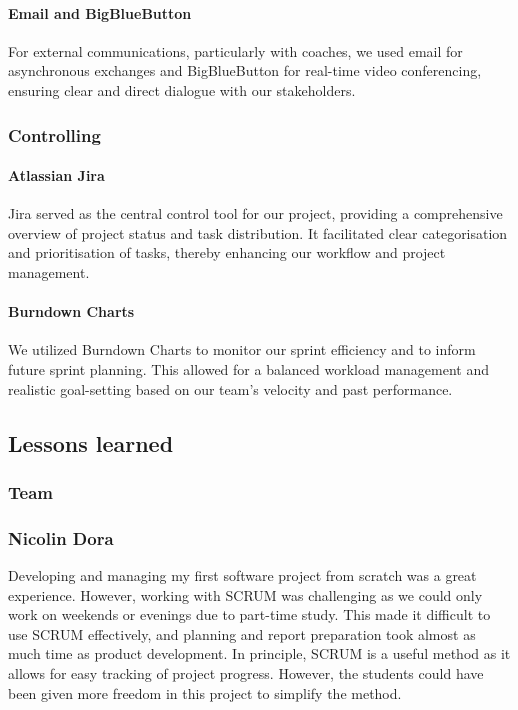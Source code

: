 \paragraph{Email and BigBlueButton}
For external communications, particularly with coaches, we used email for asynchronous exchanges and BigBlueButton for real-time video conferencing, ensuring clear and direct dialogue with our stakeholders.

\subsubsection{Controlling}

\paragraph{Atlassian Jira}
Jira served as the central control tool for our project, providing a comprehensive overview of project status and task distribution.
It facilitated clear categorisation and prioritisation of tasks, thereby enhancing our workflow and project management.

\paragraph{Burndown Charts}
We utilized Burndown Charts to monitor our sprint efficiency and to inform future sprint planning.
This allowed for a balanced workload management and realistic goal-setting based on our team's velocity and past performance.


\subsection{Lessons learned}

\subsubsection{Team}

\subsubsection{Nicolin Dora}
Developing and managing my first software project from scratch was a great experience.
However, working with SCRUM was challenging as we could only work on weekends or evenings due to part-time study.
This made it difficult to use SCRUM effectively, and planning and report preparation took almost as much time as product development.
In principle, SCRUM is a useful method as it allows for easy tracking of project progress.
However, the students could have been given more freedom in this project to simplify the method.

